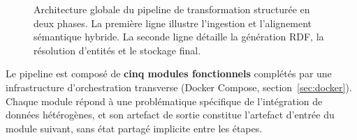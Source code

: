 \begin{figure}[ht]
{
    } %
    
    \vspace{0.4cm}
    \caption{Architecture globale du pipeline de transformation structurée en deux phases. 
             La première ligne illustre l'ingestion et l'alignement sémantique hybride. 
             La seconde ligne détaille la génération RDF, la résolution d'entités et le stockage final.}
    \label{fig:pipeline_global}
\end{figure}



Le pipeline est composé de \textbf{cinq modules fonctionnels} complétés par
une infrastructure d'orchestration transverse (Docker Compose,
section~\ref{sec:docker}). Chaque module répond à une problématique
spécifique de l'intégration de données hétérogènes, et son artefact de
sortie constitue l'artefact d'entrée du module suivant, sans état partagé
implicite entre les étapes.

